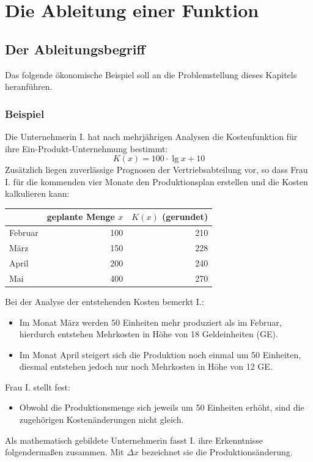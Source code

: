 \section{Die Ableitung einer Funktion}

\subsection{Der Ableitungsbegriff}

Das folgende ökonomische Beispiel soll an die Problemstellung dieses Kapitels heranführen.

\subsubsection{Beispiel}

Die Unternehmerin I. hat nach mehrjährigen Analysen die Kostenfunktion für ihre Ein-Produkt-Unternehmung bestimmt:
\[ K(x) = 100 \cdot \lg x + 10 \]
Zusätzlich liegen zuverlässige Prognosen der Vertriebsabteilung vor, so dass Frau I. für die kommenden vier Monate den Produktionsplan erstellen und die Kosten kalkulieren kann:

\begin{center}
  \begin{tabular}{lrr}
    \hline
    & geplante Menge $x$ & $K(x)$ (gerundet)\\
    \hline
    Februar & 100 & 210\\
    März & 150 & 228\\
    April & 200 & 240\\
    Mai & 400 & 270\\
    \hline
  \end{tabular}
\end{center}

Bei der Analyse der entstehenden Kosten bemerkt I.:
\begin{itemize}
  \item Im Monat März werden 50 Einheiten mehr produziert als im Februar, hierdurch entstehen Mehrkosten in Höhe von 18 Geldeinheiten (GE).
  \item Im Monat April steigert sich die Produktion noch einmal um 50 Einheiten, diesmal entstehen jedoch nur noch Mehrkosten in Höhe von 12 GE.
\end{itemize}

Frau I. stellt fest:
\begin{itemize}
  \item Obwohl die Produktionsmenge sich jeweils um 50 Einheiten erhöht, sind die zugehörigen Kostenänderungen nicht gleich.
\end{itemize}
Als mathematisch gebildete Unternehmerin fasst I. ihre Erkenntnisse folgendermaßen zusammen. Mit $\Delta x$ bezeichnet sie die Produktionsänderung.

